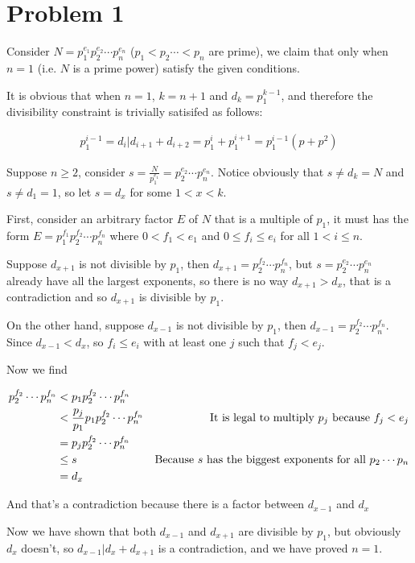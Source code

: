 \section*{Problem 1}
Consider $ N = p_1^{e_1} p_2^{e_2} \cdots p_n^{e_n} $ ($ p_1 < p_2 \cdots < p_n $ are prime), we claim that only when $ n = 1 $ (i.e. $ N $ is a prime power) satisfy the given conditions.

It is obvious that when $ n = 1 $, $ k = n + 1 $ and $ d_k = p_1^{k - 1} $, and therefore the divisibility constraint is trivially satisifed as follows:

\begin{eqnarray*}
    p_1^{i - 1} = d_i | d_{i + 1} + d_{i + 2} = p_1^i + p_1^{i + 1} = p_1^{i-1}(p + p^2)
\end{eqnarray*}

Suppose $ n \ge 2 $, consider $ s = \frac{N}{p_1^{e_1}} = p_2^{e_2} \cdots p_n^{e_n} $. Notice obviously that $ s \ne d_k = N $ and $ s \ne d_1 = 1 $, so let $ s = d_x $ for some $ 1 < x < k $.

First, consider an arbitrary factor $ E $ of $ N $ that is a multiple of $ p_1 $, it must has the form $ E = p_1^{f_1} p_2^{f_2} \cdots p_n^{f_n} $ where $ 0 < f_1 < e_1 $ and $ 0 \le f_i \le e_i $ for all $ 1 < i \le n $.

Suppose $ d_{x+1} $ is not divisible by $ p_1 $, then $ d_{x+1} = p_2^{f_2} \cdots p_n^{f_n} $, but $ s = p_2^{e_2} \cdots p_n^{e_n} $ already have all the largest exponents, so there is no way $ d_{x+1} > d_x $, that is a contradiction and so $ d_{x+1} $ is divisible by $ p_1 $.

On the other hand, suppose $ d_{x-1} $ is not divisible by $ p_1 $, then $ d_{x-1} = p_2^{f_2} \cdots p_n^{f_n} $. Since $ d_{x-1} < d_x $, so $ f_i \le e_i $ with at least one $ j $ such that $ f_j < e_j $.

Now we find 

\begin{align*}
      p_2^{f_2} \cdots p_n^{f_n} &<   p_1 p_2^{f_2} \cdots p_n^{f_n} \\
                                 &<   \frac{p_j}{p_1} p_1 p_2^{f_2} \cdots p_n^{f_n} &\text{It is legal to multiply $ p_j $ because $ f_j < e_j $} \\
                                 &=   p_j p_2^{f_2} \cdots p_n^{f_n} \\
                                 &\le s &\text{Because $ s $ has the biggest exponents for all $ p_2 \cdots p_n $} \\
                                 &=   d_x
\end{align*}

And that's a contradiction because there is a factor between $ d_{x-1} $ and $ d_x $

Now we have shown that both $ d_{x - 1} $ and $ d_{x + 1} $ are divisible by $ p_1 $, but obviously $ d_x $ doesn't, so $ d_{x-1} | d_x + d_{x+1} $ is a contradiction, and we have proved $ n = 1 $.